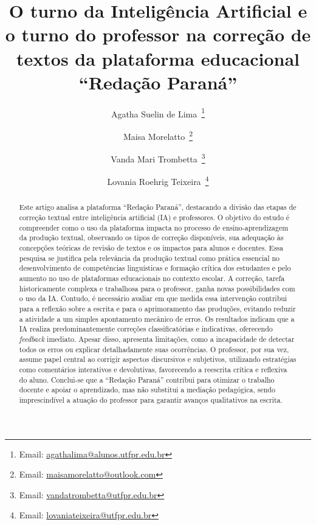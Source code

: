 \documentclass[portuguese]{textolivre}
\title{O turno da Inteligência Artificial e o turno do professor na correção de textos da plataforma educacional ``Redação Paraná''}
\author[1]{Agatha Suelin de Lima~\orcid{0009-0007-7132-5741}\thanks{Email: \href{mailto:agathalima@alunos.utfpr.edu.br}{agathalima@alunos.utfpr.edu.br}}}
\author[1]{Maisa Morelatto~\orcid{0009-0003-9537-6499}\thanks{Email: \href{mailto:maisamorelatto@outlook.com}{maisamorelatto@outlook.com}}}
\author[1]{Vanda Mari Trombetta~\orcid{0000-0002-0077-2794}\thanks{Email: \href{mailto:vandatrombetta@utfpr.edu.br}{vandatrombetta@utfpr.edu.br}}}
\author[1]{Lovania Roehrig Teixeira~\orcid{0000-0001-9614-8648}\thanks{Email: \href{mailto:lovaniateixeira@utfpr.edu.br}{lovaniateixeira@utfpr.edu.br}}}
\affil[1]{Universidade Tecnológica Federal do Paraná, Departamento de Letras, Pato Branco, PR, Brasil.}
\begin{document}
\maketitle

\begin{polyabstract}
\begin{abstract}
 Este artigo analisa a plataforma ``Redação Paraná'', destacando a divisão das etapas de correção textual entre inteligência artificial (IA) e professores. O objetivo do estudo é compreender como o uso da plataforma impacta no processo de ensino-aprendizagem da produção textual, observando os tipos de correção disponíveis, sua adequação às concepções teóricas de revisão de textos e os impactos para alunos e docentes. Essa pesquisa se justifica pela relevância da produção textual como prática essencial no desenvolvimento de competências linguísticas e formação crítica dos estudantes e pelo aumento no uso de plataformas educacionais no contexto escolar. A correção, tarefa historicamente complexa e trabalhosa para o professor, ganha novas possibilidades com o uso da IA. Contudo, é necessário avaliar em que medida essa intervenção contribui para a reflexão sobre a escrita e para o aprimoramento das produções, evitando reduzir a atividade a um simples apontamento mecânico de erros. Os resultados indicam que a IA realiza predominantemente correções classificatórias e indicativas, oferecendo \textit{feedback} imediato. Apesar disso, apresenta limitações, como a incapacidade de detectar todos os erros ou explicar detalhadamente suas ocorrências. O professor, por sua vez, assume papel central ao corrigir aspectos discursivos e subjetivos, utilizando estratégias como comentários interativos e devolutivas, favorecendo a reescrita crítica e reflexiva do aluno. Conclui-se que a ``Redação Paraná'' contribui para otimizar o trabalho docente e apoiar o aprendizado, mas não substitui a mediação pedagógica, sendo imprescindível a atuação do professor para garantir avanços qualitativos na escrita.

\end{abstract}


\end{polyabstract}
\end{document}
